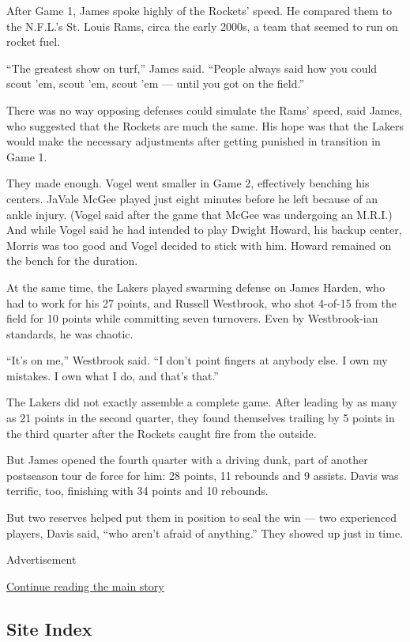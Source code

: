 After Game 1, James spoke highly of the Rockets' speed. He compared them
to the N.F.L.'s St. Louis Rams, circa the early 2000s, a team that
seemed to run on rocket fuel.

``The greatest show on turf,'' James said. ``People always said how you
could scout 'em, scout 'em, scout 'em --- until you got on the field.''

There was no way opposing defenses could simulate the Rams' speed, said
James, who suggested that the Rockets are much the same. His hope was
that the Lakers would make the necessary adjustments after getting
punished in transition in Game 1.

They made enough. Vogel went smaller in Game 2, effectively benching his
centers. JaVale McGee played just eight minutes before he left because
of an ankle injury. (Vogel said after the game that McGee was undergoing
an M.R.I.) And while Vogel said he had intended to play Dwight Howard,
his backup center, Morris was too good and Vogel decided to stick with
him. Howard remained on the bench for the duration.

At the same time, the Lakers played swarming defense on James Harden,
who had to work for his 27 points, and Russell Westbrook, who shot
4-of-15 from the field for 10 points while committing seven turnovers.
Even by Westbrook-ian standards, he was chaotic.

``It's on me,'' Westbrook said. ``I don't point fingers at anybody else.
I own my mistakes. I own what I do, and that's that.''

The Lakers did not exactly assemble a complete game. After leading by as
many as 21 points in the second quarter, they found themselves trailing
by 5 points in the third quarter after the Rockets caught fire from the
outside.

But James opened the fourth quarter with a driving dunk, part of another
postseason tour de force for him: 28 points, 11 rebounds and 9 assists.
Davis was terrific, too, finishing with 34 points and 10 rebounds.

But two reserves helped put them in position to seal the win --- two
experienced players, Davis said, ``who aren't afraid of anything.'' They
showed up just in time.

Advertisement

\protect\hyperlink{after-bottom}{Continue reading the main story}

\hypertarget{site-index}{%
\subsection{Site Index}\label{site-index}}

